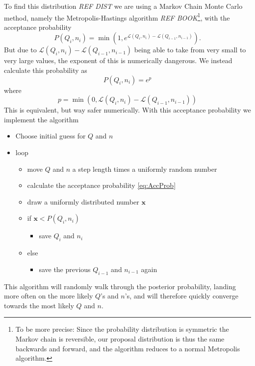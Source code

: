 \documentclass{emulateapj}
\begin{document}
To find this distribution \emph{REF DIST} we are using a Markov Chain Monte Carlo method, namely the Metropolis-Hastings algorithm \emph{REF BOOK}\footnote{To be more precise: Since the probability distribution is symmetric the Markov chain is reversible, our proposal distribution is thus the same backwards and forward, and the algorithm reduces to a normal Metropolis algorithm.}, with the acceptance probability
\begin{equation}
P(Q_i,n_i) = \min\left(1,e^{\mathcal{L}(Q_{i},n_{i})-\mathcal{L}(Q_{i-1},n_{i-1})}\right).
\end{equation} 
But due to $\mathcal{L}(Q_{i},n_{i})-\mathcal{L}(Q_{i-1},n_{i-1})$ being able to take from very small to very large values, the exponent of this is numerically dangerous. We instead calculate this probability as
\begin{equation}
P(Q_i,n_i) = e^{p}
\label{eq:AccProb}
\end{equation}
where
\begin{equation}
p = \min\left(0,\mathcal{L}(Q_{i},n_{i})-\mathcal{L}(Q_{i-1},n_{i-1})\right)
\end{equation}
This is equivalent, but way safer numerically. With this acceptance probability we implement the algorithm


\begin{itemize}
\item Choose initial guess for $Q$ and $n$
\item loop
    \begin{itemize}
     \item move $Q$ and $n$ a step length times a uniformly random number
     \item calculate the acceptance probability \eqref{eq:AccProb}
     \item draw a uniformly distributed number $\mathbf{x}$
     \item if $\mathbf{x} < P(Q_i,n_i)$
     \begin{itemize}
     \item save $Q_i$ and $n_i$
     \end{itemize}
     \item else
     \begin{itemize}
     \item save the previous $Q_{i-1}$ and $n_{i-1}$ again
     \end{itemize}
     \end{itemize}
\end{itemize}

This algorithm will randomly walk through the posterior probability, landing more often on the more likely $Q$'s and $n$'s, and will therefore quickly converge towards the most likely $Q$ and $n$.
\end{document}
